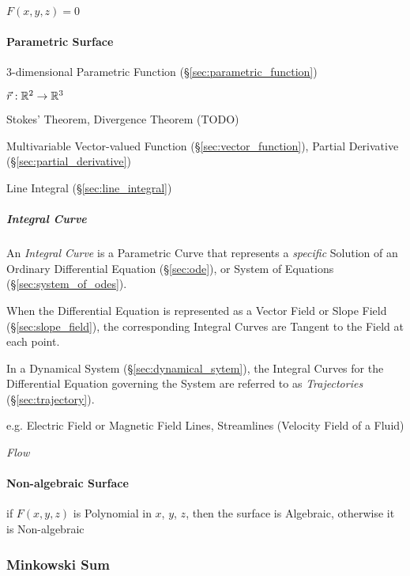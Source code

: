 $F(x,y,z) = 0$



\paragraph{Parametric Surface}\label{sec:parametric_surface}\hfill

3-dimensional Parametric Function (\S\ref{sec:parametric_function})

$\vec{r} : \mathbb{R}^2 \rightarrow \mathbb{R}^3$

Stokes' Theorem, Divergence Theorem (TODO)

Multivariable Vector-valued Function (\S\ref{sec:vector_function}),
Partial Derivative (\S\ref{sec:partial_derivative})

Line Integral (\S\ref{sec:line_integral})



\subparagraph{Integral Curve}\label{sec:integral_curve}\hfill

An \emph{Integral Curve} is a Parametric Curve that represents a
\emph{specific} Solution of an Ordinary Differential Equation
(\S\ref{sec:ode}), or System of Equations (\S\ref{sec:system_of_odes}).

When the Differential Equation is represented as a Vector Field or Slope Field
(\S\ref{sec:slope_field}), the corresponding Integral Curves are Tangent to the
Field at each point.

In a Dynamical System (\S\ref{sec:dynamical_sytem}), the Integral Curves for
the Differential Equation governing the System are referred to as
\emph{Trajectories} (\S\ref{sec:trajectory}).

e.g. Electric Field or Magnetic Field Lines, Streamlines (Velocity Field of a
Fluid)

\emph{Flow}



\paragraph{Non-algebraic Surface}\label{sec:nonalgebraic_surface}\hfill

if $F(x,y,z)$ is Polynomial in $x$, $y$, $z$, then the surface is
Algebraic, otherwise it is Non-algebraic



\subsubsection{Minkowski Sum}\label{sec:minkowski_sum}

